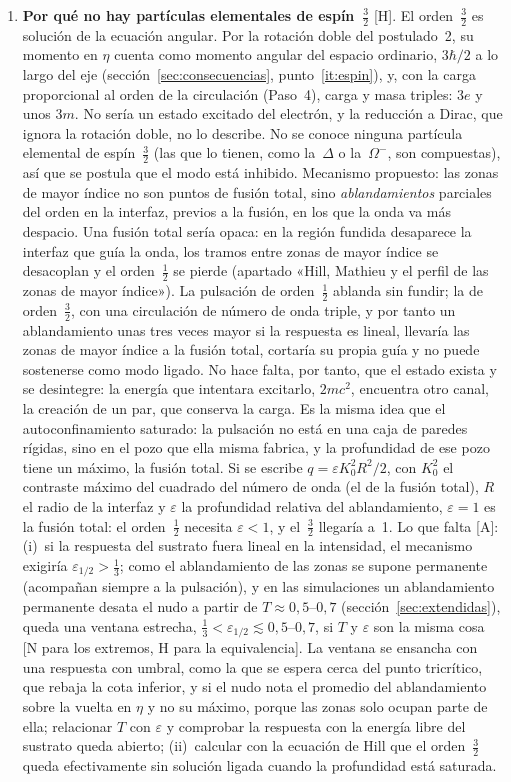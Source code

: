 \documentclass[11pt,a4paper]{article}
\newcommand{\st}[1]{\textup{[#1]}}
\begin{document}
\begin{enumerate}[label=\arabic*.,ref=\arabic*,leftmargin=*]
\item \label{ab:tresmedios}\textbf{Por qué no hay partículas elementales de espín~$\tfrac32$} \st{H}. El orden~$\tfrac32$ es solución de la ecuación angular. Por la rotación doble del postulado~2, su momento en $\eta$ cuenta como momento angular del espacio ordinario, $3\hbar/2$ a lo largo del eje (sección~\ref{sec:consecuencias}, punto~\ref{it:espin}), y, con la carga proporcional al orden de la circulación (Paso~4), carga y masa triples: $3e$ y unos $3m$. No sería un estado excitado del electrón, y la reducción a Dirac, que ignora la rotación doble, no lo describe. No se conoce ninguna partícula elemental de espín~$\tfrac32$ (las que lo tienen, como la~$\Delta$ o la~$\Omega^-$, son compuestas), así que se postula que el modo está inhibido. Mecanismo propuesto: las zonas de mayor índice no son puntos de fusión total, sino \emph{ablandamientos} parciales del orden en la interfaz, previos a la fusión, en los que la onda va más despacio. Una fusión total sería opaca: en la región fundida desaparece la interfaz que guía la onda, los tramos entre zonas de mayor índice se desacoplan y el orden~$\tfrac12$ se pierde (apartado «Hill, Mathieu y el perfil de las zonas de mayor índice»). La pulsación de orden~$\tfrac12$ ablanda sin fundir; la de orden~$\tfrac32$, con una circulación de número de onda triple, y por tanto un ablandamiento unas tres veces mayor si la respuesta es lineal, llevaría las zonas de mayor índice a la fusión total, cortaría su propia guía y no puede sostenerse como modo ligado. No hace falta, por tanto, que el estado exista y se desintegre: la energía que intentara excitarlo, $2mc^2$, encuentra otro canal, la creación de un par, que conserva la carga. Es la misma idea que el autoconfinamiento saturado: la pulsación no está en una caja de paredes rígidas, sino en el pozo que ella misma fabrica, y la profundidad de ese pozo tiene un máximo, la fusión total. Si se escribe $q=\varepsilon K_0^2R^2/2$, con $K_0^2$ el contraste máximo del cuadrado del número de onda (el de la fusión total), $R$ el radio de la interfaz y $\varepsilon$ la profundidad relativa del ablandamiento, $\varepsilon=1$ es la fusión total: el orden~$\tfrac12$ necesita $\varepsilon<1$, y el~$\tfrac32$ llegaría a~1. Lo que falta \st{A}: (i)~si la respuesta del sustrato fuera lineal en la intensidad, el mecanismo exigiría $\varepsilon_{1/2}>\tfrac13$; como el ablandamiento de las zonas se supone permanente (acompañan siempre a la pulsación), y en las simulaciones un ablandamiento permanente desata el nudo a partir de $T\approx0{,}5$--$0{,}7$ (sección~\ref{sec:extendidas}), queda una ventana estrecha, $\tfrac13<\varepsilon_{1/2}\lesssim0{,}5$--$0{,}7$, si $T$ y $\varepsilon$ son la misma cosa \st{N para los extremos, H para la equivalencia}. La ventana se ensancha con una respuesta con umbral, como la que se espera cerca del punto tricrítico, que rebaja la cota inferior, y si el nudo nota el promedio del ablandamiento sobre la vuelta en $\eta$ y no su máximo, porque las zonas solo ocupan parte de ella; relacionar $T$ con $\varepsilon$ y comprobar la respuesta con la energía libre del sustrato queda abierto; (ii)~calcular con la ecuación de Hill que el orden~$\tfrac32$ queda efectivamente sin solución ligada cuando la profundidad está saturada.

\end{enumerate}
\end{document}
